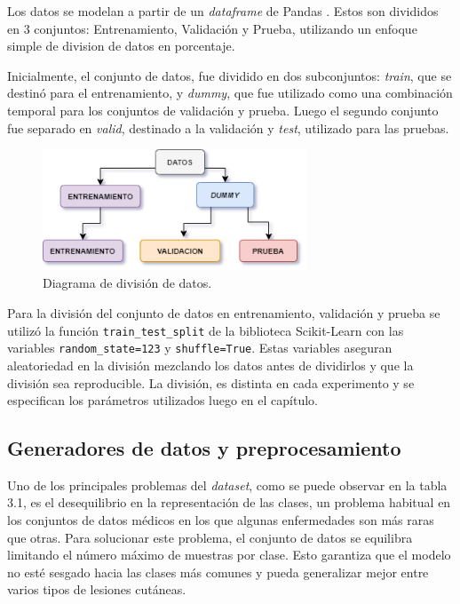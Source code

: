Los datos se modelan a partir de un \textit{dataframe} de Pandas . Estos son divididos en 3 conjuntos: Entrenamiento, Validación y Prueba, utilizando un enfoque simple de division de datos en porcentaje.

Inicialmente, el conjunto de datos, fue dividido en dos subconjuntos: \textit{train}, que se destinó para el entrenamiento, y \textit{dummy}, que fue utilizado como una combinación temporal para los conjuntos de validación y prueba. Luego el segundo conjunto fue separado en \textit{valid}, destinado a la validación y \textit{test}, utilizado para las pruebas. 

\begin{figure}[H]
    \begin{center}
    \includegraphics[width=0.7\textwidth]{./Graphics/division_datos.drawio.png}
    \caption{Diagrama de división de datos.}
    \label{fig:model_structure}
    \end{center}
    \end{figure}

Para la división del conjunto de datos en entrenamiento, validación y prueba se utilizó la función \texttt{train\_test\_split} de la biblioteca Scikit-Learn con las variables \texttt{random\_state=123} y \texttt{shuffle=True}. Estas variables aseguran aleatoriedad en la división mezclando los datos antes de dividirlos y que la división sea reproducible. La división, es distinta en cada experimento y se especifican los parámetros utilizados luego en el capítulo.


\subsection{Generadores de datos y preprocesamiento}

Uno de los principales problemas del \textit{dataset}, como se puede observar en la tabla 3.1, es el desequilibrio en la representación de las clases, un problema habitual en los conjuntos de datos médicos en los que algunas enfermedades son más raras que otras. Para solucionar este problema, el conjunto de datos se equilibra limitando el número máximo de muestras por clase. Esto garantiza que el modelo no esté sesgado hacia las clases más comunes y pueda generalizar mejor entre varios tipos de lesiones cutáneas. 

